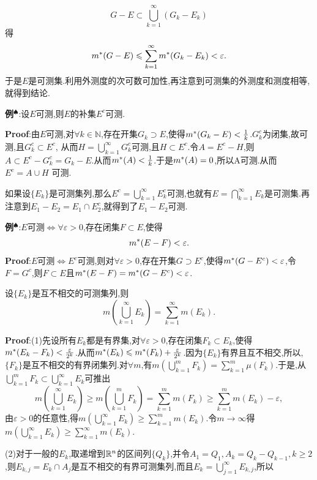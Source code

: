 $$
G-E\subset\bigcup_{k=1}^{\infty}(G_{k}-E_{k})
$$
得
$$
m^*(G-E)\leqslant\sum_{k=1}^{\infty}m^*(G_{k}-E_{k})<\varepsilon.
$$
于是$E$是可测集.利用外测度的次可数可加性,再注意到可测集的外测度和测度相等,就得到结论.\par
\textbf{例}$^\spadesuit$:设$E$可测,则$E$的补集$E^{c}$可测.\par
\textbf{Proof}:由$E$可测,对$\forall k\in\mathbb{N}$,存在开集$G_{k}\supset E$,使得$m^*(G_{k}-E)<\frac{1}{k}$.$G_{k}^{c}$为闭集,故可测,且$G_{k}^{c}\subset E^{c}$,
从而$H=\bigcup_{k=1}^{\infty}G_{k}^{c}$可测,且$H\subset E^{c}$.令$A=E^{c}-H$,则$A\subset E^{c}-G_{k}^{c}=G_{k}-E$.从而$m^*(A)<\frac{1}{k}$.于是$m^*(A)=0$,所以A可测.从而$E^{c}=A\cup H$ 可测.\par
如果设$\{E_{k}\}$是可测集列,那么$E^{c}=\bigcup_{k=1}^{\infty}E_{k}^{c}$可测,也就有$E=\bigcap_{k=1}^{\infty}E_{k}$是可测集.再注意到$E_1-E_2=E_1\cap E_2^c$,就得到了$E_1-E_2$可测.\par
\textbf{例}$^\spadesuit$:$E$可测$\Longleftrightarrow \forall\varepsilon>0$,存在闭集$F{\subset}E$,使得  
$$
m^*(E-F)<\varepsilon.
$$
\qquad \textbf{Proof}:$E$可测$\Leftrightarrow E^{c}$可测,则对$\forall\varepsilon>0$,存在开集$G\supset E^{c}$,使得$m^*(G-E^c)<\varepsilon$,令$F=G^{c}$,则$F\subset E$且$m^*(E-F)=m^*(G-E^{c})<\varepsilon$.  
\begin{tcolorbox}[colback=KuangNei,colframe=BianKuang,title=\textbf{Lebesgue测度的可数可加性},sharpish corners]
设$\{E_{k}\}$是互不相交的可测集列,则  
$$
m\left(\bigcup_{k=1}^{\infty}E_{k}\right)=\sum_{k=1}^{\infty}m(E_{k}).
$$ 
\end{tcolorbox}
\textbf{Proof}:(1)先设所有$E_{k}$都是有界集,对$\forall\varepsilon>0$,存在闭集$F_{k}\subset E_{k}$,使得$m^*(E_{k}-F_{k})<\frac{\varepsilon}{2^{k}}$.从而$m^*(E_{k})\leqslant m^*(F_{k})+\frac{\varepsilon}{2^{k}}$.因为$\{E_{k}\}$有界且互不相交,所以,$\{F_{k}\}$是互不相交的有界闭集列.对$\forall m$,有$m\left(\bigcup_{k=1}^{m}F_{k}\right)=\sum_{k=1}^{m}\mu(F_{k})$.于是,从$\bigcup_{k=1}^{m}F_{k}\subset\bigcup_{k=1}^{\infty}E_{k}$可推出  
$$
m\left(\bigcup_{k=1}^{\infty}E_{k}\right)\geqslant m\left(\bigcup_{k=1}^{m}F_{k}\right)=\sum_{k=1}^{m}m\left(F_{k}\right)\geqslant\sum_{k=1}^{m}m\left(E_{k}\right)-\varepsilon,
$$  
由$\varepsilon>0$的任意性,得$m\left(\bigcup_{k=1}^{\infty}E_{k}\right)\geqslant\sum_{k=1}^{m}m\left(E_{k}\right)$.令$m\to \infty$得$m\left(\bigcup_{k=1}^{\infty}E_{k}\right)\geqslant\sum_{k=1}^{\infty}m\left(E_{k}\right)$.\par  
(2)对于一般的$E_{k}$,取递增到$\mathbb{R} ^n$的区间列$\{Q_{k}\}$,并令$A_{1}=Q_{1},A_{k}=Q_{k}-Q_{k-1},k{\geqslant}2$,则$E_{k,j}=E_{k}\cap A_{j}$是互不相交的有界可测集列,而且$E_{k}=\bigcup_{j = 1}^{\infty}E_{k,j}$,所以
